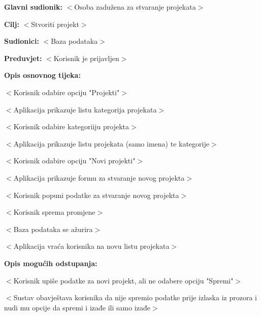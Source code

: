 					\noindent {}
					\begin{packed_item}

						\item \textbf{Glavni sudionik: }$<$Osoba zadužena za stvaranje projekata$>$
						\item  \textbf{Cilj:} $<$Stvoriti projekt$>$
						\item  \textbf{Sudionici:} $<$Baza podataka$>$
						\item  \textbf{Preduvjet:} $<$Korisnik je prijavljen$>$
						\item  \textbf{Opis osnovnog tijeka:}

						\item[] \begin{packed_enum}

							\item $<$Korisnik odabire opciju "Projekti"$>$
							\item $<$Aplikacija prikazuje listu kategorija projekata$>$
							\item $<$Korisnik odabire kategoriiju projekta$>$
							\item $<$Aplikacija prikazuje listu projekata (samo imena) te kategorije$>$
							\item $<$Korisnik odabire opciju "Novi projekti"$>$
							\item $<$Aplikacija prikazuje formu za stvaranje novog projekta$>$
							\item $<$Korisnik popuni podatke za stvaranje novog projekta$>$
							\item $<$Korisnik sprema promjene$>$
							\item $<$Baza podataka se ažurira$>$
							\item $<$Aplikacija vraća korisnika na novu listu projekata$>$
						\end{packed_enum}

						\item  \textbf{Opis mogućih odstupanja:}

						\item[] \begin{packed_item}

							\item[7.a] $<$Korisnik upiše podatke za novi projekt, ali ne odabere opciju "Spremi"$>$
							\item[] \begin{packed_enum}

								\item $<$Sustav obavještava korisnika da nije spremio podatke prije izlaska
								iz prozora i nudi mu opcije da spremi i izađe ili samo izađe$>$


\end{packed_enum}
\end{packed_item}
\end{packed_item}
